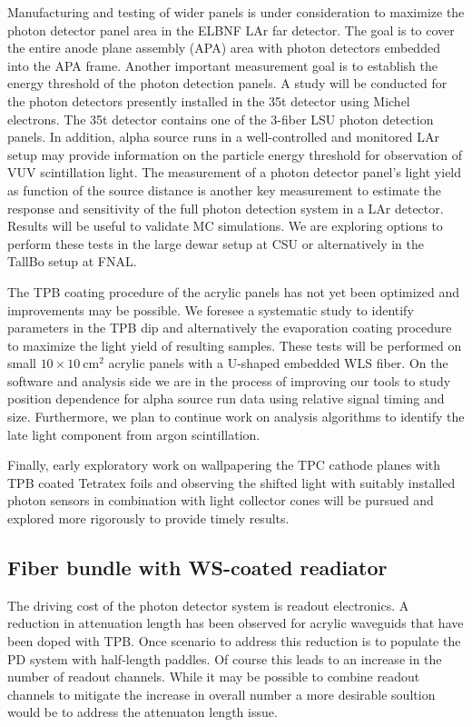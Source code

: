 Manufacturing and testing of wider panels is under consideration to
maximize the photon detector panel area in the ELBNF LAr far
detector. The goal is to cover the entire anode plane assembly (APA)
area with photon detectors embedded into the APA frame.  Another
important measurement goal is to establish the energy threshold of the
photon detection panels. A study will be conducted for the photon
detectors presently installed in the 35t detector using Michel
electrons. The 35t detector contains one of the 3-fiber LSU photon
detection panels. In addition, alpha source runs in a well-controlled
and monitored LAr setup may provide information on the particle energy
threshold for observation of VUV scintillation light.  The measurement
of a photon detector panel's light yield as function of the source
distance is another key measurement to estimate the response and
sensitivity of the full photon detection system in a LAr
detector. Results will be useful to validate MC simulations.  We are
exploring options to perform these tests in the large dewar setup at
CSU or alternatively in the TallBo setup at FNAL.

The TPB coating procedure of the acrylic panels has not yet been
optimized and improvements may be possible. We foresee a systematic
study to identify parameters in the TPB dip and alternatively the
evaporation coating procedure to maximize the light yield of resulting
samples. These tests will be performed on small
$10\times10~\mathrm{cm}^2$ acrylic panels with a U-shaped embedded WLS
fiber.  On the software and analysis side we are in the process of
improving our tools to study position dependence for alpha source run
data using relative signal timing and size. Furthermore, we plan to
continue work on analysis algorithms to identify the late light
component from argon scintillation.

Finally, early exploratory work on wallpapering the TPC cathode planes
with TPB coated Tetratex foils and observing the shifted light with
suitably installed photon sensors in combination with light collector
cones will be pursued and explored more rigorously to provide timely
results.


\subsection{Fiber bundle with WS-coated readiator}

The driving cost of the photon detector system is readout
electronics. A reduction in attenuation length has been observed for
acrylic waveguids that have been doped with TPB. Once scenario to
address this reduction is to populate the PD system with half-length
paddles. Of course this leads to an increase in the number of readout
channels. While it may be possible to combine readout channels to
mitigate the increase in overall number a more desirable soultion
would be to address the attenuaton length issue.   

